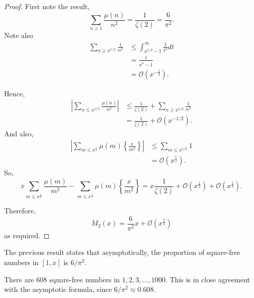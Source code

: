 \documentclass{unswmaths}
\begin{document}
\begin{proof}
    First note the result,
    \begin{equation*}
        \sum_{n\geq 1} \frac{\mu(n)}{n^2} = \frac{1}{\zeta(2)} = \frac{6}{\pi^2}.
    \end{equation*}
    Note also
    \begin{align*}
        \sum_{n\geq x^{1/2}} \frac{1}{n^2} &\leq \int_{x^{1/2}-1}^\infty \frac{1}{t^2}dt\\
        &= \frac{1}{x^{^\frac{1}{2}}-1}\\
        &= \mathcal{O}(x^{-\frac{1}{2}}).
    \end{align*}
    
    Hence,
    \begin{align*}
        |\sum_{n\leq x^{1/2}} \frac{\mu(n)}{n^2}| &\leq \frac{1}{\zeta(2)}+\sum_{n\geq x^{1/2}} \frac{1}{n^2}\\
        &= \frac{1}{\zeta(2)}+\mathcal{O}(x^{-1/2}).
    \end{align*}
    And also,
    \begin{align*}
        |\sum_{m\leq x^\frac{1}{2}}\mu(m)\left\{\frac{x}{m^2}\right\}| &\leq \sum_{m\leq x^{1/2}} 1\\
        &= \mathcal{O}(x^\frac{1}{2}).
    \end{align*}
    So,
    \begin{equation*}
        x\sum_{m\leq x^\frac{1}{2}} \frac{\mu(m)}{m^2}-\sum_{m\leq x^\frac{1}{2}}\mu(m)\left\{\frac{x}{m^2}\right\} = x\frac{1}{\zeta(2)}+\mathcal{O}(x^{\frac{1}{2}})+\mathcal{O}(x^\frac{1}{2}).
    \end{equation*}
    
    Therefore,
    \begin{equation*}
        M_2(x) = \frac{6}{\pi^2}x+\mathcal{O}(x^\frac{1}{2})
    \end{equation*}
    as required.
    
    
\end{proof}
\begin{remark}
    The previous result states that asymptotically, the proportion
    of square-free numbers in $[1,x]$ is $6/\pi^2$.
\end{remark}
\begin{remark}
    There are $608$ square-free numbers in $1,2,3,\ldots,1000$. 
    This is in close agreement with the asymptotic formula,
    since $6/\pi^2 \approx 0.608$.
\end{remark}
\end{document}
